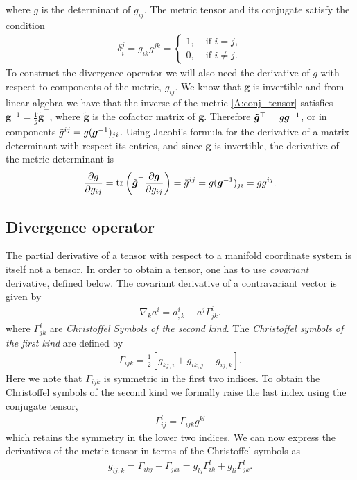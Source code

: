 where $g$ is the determinant of $g_{ij}$. The metric tensor and its conjugate
satisfy the condition
\begin{align*}
    \delta_i^j = g_{ik}g^{jk} = 
    \begin{cases}
        1,\; &\mbox{if } i = j,\\
        0,\; &\mbox{if } i\ne j.
    \end{cases}
\end{align*}
To construct the divergence operator we will also need the derivative of 
$g$ with respect to components of the metric, $g_{ij}$. We know that $\bm{g}$ 
is invertible and from linear algebra we have that the inverse of the metric 
\eqref{A:conj_tensor} satisfies 
$\bm{g}^{-1} = \frac{1}{g}\tilde{\bm{g}}^{\top}$, where $\bm{\tilde{g}}$ is the
cofactor matrix of $\bm{g}$. Therefore $\bm{\tilde{g}}^{\top} = g\mbox{\boldmath $g$}^{-1}$, 
or in components $\tilde{g}^{ij} = g(\mbox{\boldmath $g$}^{-1})_{ji}$. Using Jacobi's formula 
for the derivative of a matrix determinant with respect its entries, and since 
$\bm{g}$ is invertible, the derivative of the metric determinant is
\begin{align}
    \frac{\partial g}{\partial g_{ij}} = \mathrm{tr}\left(\tilde{\bm{g}}^{\top}\frac{\partial \bm{g}}{\partial g_{ij}}\right)
        = \tilde{g}^{ij} = g(\mbox{\boldmath $g$}^{-1})_{ji} = gg^{ij}.
\label{A:g_deriv}
\end{align}


\subsection{Divergence operator}
The partial derivative of a tensor with respect to a manifold coordinate system
is itself not a tensor. In order to obtain a tensor, one has to use 
\emph{covariant} derivative, defined below.
The covariant derivative of a contravariant vector is given by
\begin{align}
    \nabla_k a^i = a^i_{,k} + a^j \Gamma_{jk}^i.
    \label{A:cov_diff}
\end{align}
where $\Gamma_{jk}^i$ are \emph{Christoffel Symbols of the second kind}.
The \emph{Christoffel symbols of the first kind} are defined by
\begin{align*}
    \Gamma_{ijk} = \frac{1}{2}\left[g_{kj,i} + g_{ik,j} - g_{ij,k}\right].
\end{align*}
Here we note that $\Gamma_{ijk}$ is symmetric in the first two indices. To 
obtain the Christoffel symbols of the second kind we formally raise the 
last index using the conjugate tensor,
\begin{align}
    \Gamma_{ij}^l = \Gamma_{ijk}g^{kl}
    \label{A:CS2}
\end{align}
which retains the symmetry in the lower two indices. We can now express the
derivatives of the metric tensor in terms of the Christoffel symbols as
\begin{align*}
    g_{ij,k} = \Gamma_{ikj} + \Gamma_{jki} 
             = g_{lj}\Gamma_{ik}^l + g_{li}\Gamma_{jk}^l.
\end{align*}

